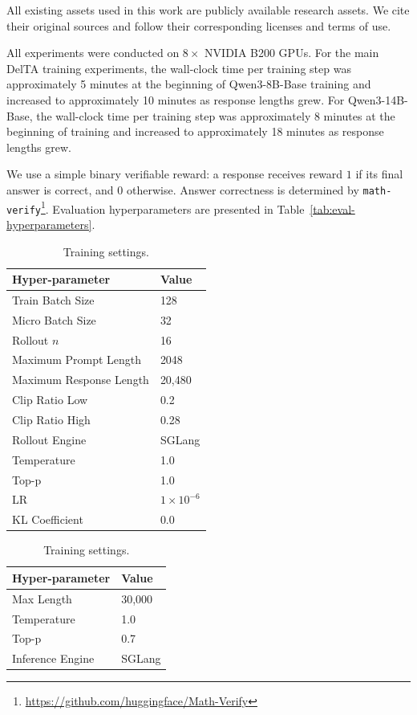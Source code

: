 \documentclass{llmxive}
\begin{document}
All existing assets used in this work are publicly available research assets. We cite their original sources and follow their corresponding licenses and terms of use.


All experiments were conducted on \(8\times\) NVIDIA B200 GPUs. 
For the main DelTA training experiments, the wall-clock time per training step was approximately 5 minutes at the beginning of Qwen3-8B-Base training and increased to approximately 10 minutes as response lengths grew.
For Qwen3-14B-Base, the wall-clock time per training step was approximately 8 minutes at the beginning of training and increased to approximately 18 minutes as response lengths grew.



We use a simple binary verifiable reward: a response receives reward \(1\) if its final answer is correct, and \(0\) otherwise. Answer correctness is determined by \texttt{math-verify}\footnote{\url{https://github.com/huggingface/Math-Verify}}. Evaluation hyperparameters are presented in Table~\ref{tab:eval-hyperparameters}.
\begin{table}[t]  
\begin{center}
\begin{minipage}[t]{0.48\linewidth}
\centering
\begin{tabular}{ll}
\toprule
Hyper-parameter & Value \\
\midrule
Train Batch Size & 128  \\
Micro Batch Size & 32 \\
Rollout $n$ & 16 \\
Maximum Prompt Length & 2048 \\
Maximum Response Length & 20,480 \\
Clip Ratio Low & 0.2 \\
Clip Ratio High & 0.28 \\
Rollout Engine & SGLang \\
Temperature & 1.0 \\
Top-p & 1.0 \\
LR & $1\times 10^{-6}$ \\
KL Coefficient & 0.0 \\
\bottomrule
\end{tabular}
\end{minipage}  
\hfil
\begin{minipage}[t]{0.48\linewidth}

\caption{Evaluation hyper-parameters.}
\label{tab:eval-hyperparameters}
\centering
\begin{tabular}{ll}
\toprule
Hyper-parameter & Value \\
\midrule
Max Length & 30,000  \\
Temperature & 1.0 \\
Top-p & 0.7 \\
Inference Engine & SGLang \\
\bottomrule
\end{tabular}
\end{minipage} 
\end{center}
\caption{Training settings.}
\label{tab:RL-hyper-parameters}
\end{table}
\end{document}
